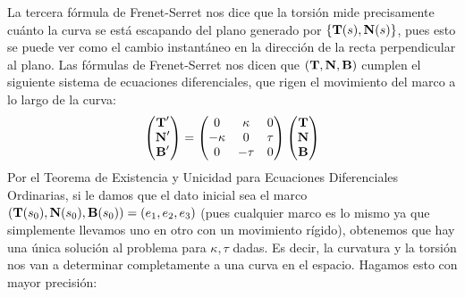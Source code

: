 La tercera fórmula de Frenet-Serret nos dice que la torsión mide precisamente cuánto la curva se está escapando del plano generado por $\{\operatorname{\mathbf{T}}(s),\operatorname{\mathbf{N}}(s)\}$, pues esto se puede ver como el cambio instantáneo en la dirección de la recta perpendicular al plano. Las fórmulas de Frenet-Serret nos dicen que $(\operatorname{\mathbf{T}},\operatorname{\mathbf{N}},\operatorname{\mathbf{B}})$ cumplen el siguiente sistema de ecuaciones diferenciales, que rigen el movimiento del marco a lo largo de la curva: $$\begin{pmatrix}\operatorname{\mathbf{T}}' \\ \operatorname{\mathbf{N}}'\\ \operatorname{\mathbf{B}}'\end{pmatrix} = \begin{pmatrix}0& \kappa & 0 \\ -\kappa & 0 & \tau \\ 0 & -\tau & 0\end{pmatrix}\begin{pmatrix}\operatorname{\mathbf{T}} \\ \operatorname{\mathbf{N}} \\ \operatorname{\mathbf{B}}\end{pmatrix}$$ Por el Teorema de Existencia y Unicidad para Ecuaciones Diferenciales Ordinarias, si le damos que el dato inicial sea el marco $(\operatorname{\mathbf{T}}(s_0),\operatorname{\mathbf{N}}(s_0),\operatorname{\mathbf{B}}(s_0)) = (e_1,e_2,e_3)$ (pues cualquier marco es lo mismo ya que simplemente llevamos uno en otro con un movimiento rígido), obtenemos que hay una única solución al problema para $\kappa,\tau$ dadas. Es decir, la curvatura y la torsión nos van a determinar completamente a una curva en el espacio. Hagamos esto con mayor precisión:

